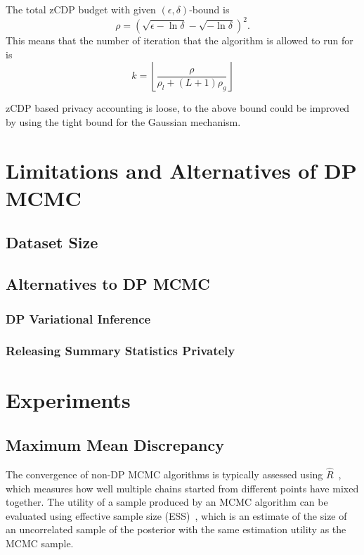 \documentclass[english,twoside,openright]{HYgraduMLDS}
\begin{document}
The total zCDP budget with given \((\epsilon, \delta)\)-bound is 
\[
    \rho = \left(\sqrt{\epsilon - \ln \delta} - \sqrt{-\ln \delta}\right)^2.
\]
This means that the number of iteration that the algorithm is allowed to run for 
is 
\[
    k = \left\lfloor\frac{\rho}{\rho_l + (L + 1)\rho_g}\right\rfloor
\]

zCDP based privacy accounting is loose, to the above bound could be improved 
by using the tight bound for the Gaussian mechanism.



\chapter{Limitations and Alternatives of DP MCMC}

\section{Dataset Size}

\section{Alternatives to DP MCMC}

\subsection{DP Variational Inference}
\subsection{Releasing Summary Statistics Privately}

\chapter{Experiments}

\section{Maximum Mean Discrepancy}

The convergence of non-DP MCMC algorithms is typically assessed using 
\(\hat{R}\)~\cite{BDA}, which measures how well multiple chains started from 
different points have mixed together. The utility of a sample produced by an 
MCMC algorithm can be evaluated using effective sample size (ESS)~\cite{BDA},
which is an estimate of the size of an uncorrelated sample of the posterior
with the same estimation utility as the MCMC sample. 
\end{document}

